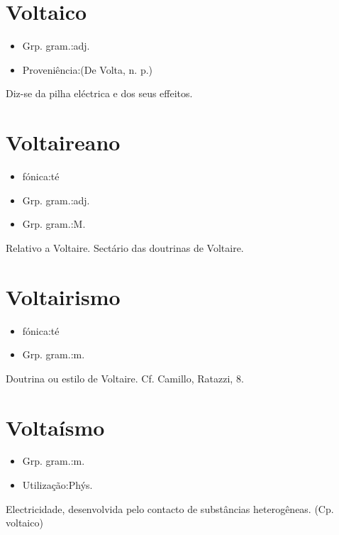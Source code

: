 \documentclass{article}
\begin{document}
\section{Voltaico}
\begin{itemize}
\item {Grp. gram.:adj.}
\end{itemize}
\begin{itemize}
\item {Proveniência:(De \textunderscore Volta\textunderscore , n. p.)}
\end{itemize}
Diz-se da pilha eléctrica e dos seus effeitos.
\section{Voltaireano}
\begin{itemize}
\item {fónica:té}
\end{itemize}
\begin{itemize}
\item {Grp. gram.:adj.}
\end{itemize}
\begin{itemize}
\item {Grp. gram.:M.}
\end{itemize}
Relativo a Voltaire.
Sectário das doutrinas de Voltaire.
\section{Voltairismo}
\begin{itemize}
\item {fónica:té}
\end{itemize}
\begin{itemize}
\item {Grp. gram.:m.}
\end{itemize}
Doutrina ou estilo de Voltaire. Cf. Camillo, \textunderscore Ratazzi\textunderscore , 8.
\section{Voltaísmo}
\begin{itemize}
\item {Grp. gram.:m.}
\end{itemize}
\begin{itemize}
\item {Utilização:Phýs.}
\end{itemize}
Electricidade, desenvolvida pelo contacto de substâncias heterogêneas.
(Cp. \textunderscore voltaico\textunderscore )
\end{document}
